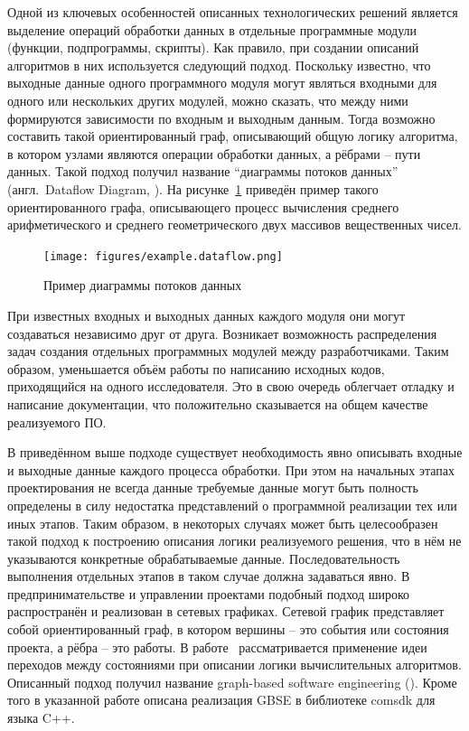 Одной из ключевых особенностей описанных технологических решений является выделение операций обработки данных в отдельные программные модули (функции, подпрограммы, скрипты). Как правило, при создании описаний алгоритмов в них используется следующий подход. Поскольку известно, что выходные данные одного программного модуля могут являться входными для одного или нескольких других модулей, можно сказать, что между ними формируются зависимости по входным и выходным данным. Тогда возможно составить такой ориентированный граф, описывающий общую логику алгоритма, в котором узлами являются операции обработки данных, а рёбрами -- пути данных. Такой подход получил название ``диаграммы потоков данных'' (англ.~Dataflow Diagram, ). На рисунке~\ref{fig:exampleDataflow} приведён пример такого ориентированного графа, описывающего процесс вычисления среднего арифметического и среднего геометрического двух массивов вещественных чисел.
\begin{figure}
  \centering
  \texttt{[image: figures/example.dataflow.png]}
  \caption{Пример диаграммы потоков данных}
  \label{fig:exampleDataflow}
\end{figure}

При известных входных и выходных данных каждого модуля они могут создаваться независимо друг от друга\cite{DanilovPar2011}. Возникает возможность распределения задач создания отдельных программных модулей между разработчиками. Таким образом, уменьшается объём работы по написанию исходных кодов, приходящийся на одного исследователя. Это в свою очередь облегчает отладку и написание документации, что положительно сказывается на общем качестве реализуемого ПО.

В приведённом выше подходе существует необходимость явно описывать входные и выходные данные каждого процесса обработки. При этом на начальных этапах проектирования не всегда данные требуемые данные могут быть полность определены в силу недостатка представлений о программной реализации тех или иных этапов. Таким образом, в некоторых случаях может быть целесообразен такой подход к построению описания логики реализуемого решения, что в нём не указываются конкретные обрабатываемые данные. Последовательность выполнения отдельных этапов в таком случае должна задаваться явно. В предпринимательстве и управлении проектами подобный подход широко распространён и реализован в сетевых графиках. Сетевой график представляет собой ориентированный граф, в котором вершины -- это события или состояния проекта, а рёбра -- это работы. В работе~\cite{SokolovPershin2018} рассматривается применение идеи переходов между состояниями при описании логики вычислительных алгоритмов. Описанный подход получил название graph-based software engineering (). Кроме того в указанной работе описана реализация GBSE в библиотеке comsdk для языка C++.

